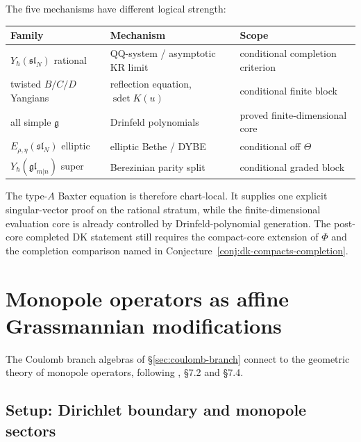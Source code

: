 \begin{remark}
\label{rem:mc3-unified-mechanism-five-family}
The five mechanisms have different logical strength:
\begin{center}
\renewcommand{\arraystretch}{1.15}
\begin{tabular}{lll}
\toprule
Family & Mechanism & Scope \\
\midrule
$Y_\hbar(\mathfrak{sl}_N)$ rational & QQ-system / asymptotic KR limit & conditional completion criterion \\
twisted $B/C/D$ Yangians & reflection equation, $\operatorname{sdet}K(u)$ & conditional finite block \\
all simple $\mathfrak g$ & Drinfeld polynomials & proved finite-dimensional core \\
$E_{\rho,\eta}(\mathfrak{sl}_N)$ elliptic & elliptic Bethe / DYBE & conditional off $\Theta$ \\
$Y_\hbar(\mathfrak{gl}_{m|n})$ super & Berezinian parity split & conditional graded block \\
\bottomrule
\end{tabular}
\end{center}
The type-$A$ Baxter equation is therefore chart-local. It supplies
one explicit singular-vector proof on the rational stratum, while the
finite-dimensional evaluation core is already controlled by
Drinfeld-polynomial generation. The post-core completed DK statement
still requires the compact-core extension of \(\Phi\) and the
completion comparison named in
Conjecture~\ref{conj:dk-compacts-completion}.
\end{remark}

\section{Monopole operators as affine Grassmannian modifications}
\label{sec:monopole-affine-grassmannian}

The Coulomb branch algebras of
\S\ref{sec:coulomb-branch} connect to the geometric theory of monopole
operators, following \cite{CDG2023}, \S7.2 and \S7.4.

\subsection{Setup: Dirichlet boundary and monopole sectors}
\label{sec:monopole-dirichlet-setup}

